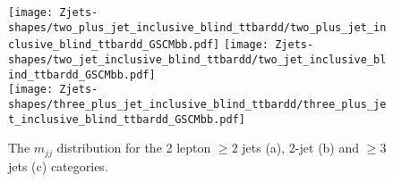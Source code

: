 \begin{figure}[!htb]
  \centering
  \texttt{[image: Zjets-shapes/two\_plus\_jet\_inclusive\_blind\_ttbardd/two\_plus\_jet\_inclusive\_blind\_ttbardd\_GSCMbb.pdf]}
  \texttt{[image: Zjets-shapes/two\_jet\_inclusive\_blind\_ttbardd/two\_jet\_inclusive\_blind\_ttbardd\_GSCMbb.pdf]} \\
  \texttt{[image: Zjets-shapes/three\_plus\_jet\_inclusive\_blind\_ttbardd/three\_plus\_jet\_inclusive\_blind\_ttbardd\_GSCMbb.pdf]}
  \caption{The $m_{jj}$ distribution for the 2 lepton $\geq 2$ jets (a), 2-jet
    (b) and $\ge 3$ jets (c) categories.}
  \label{fig:2lepmbb_model}
\end{figure}